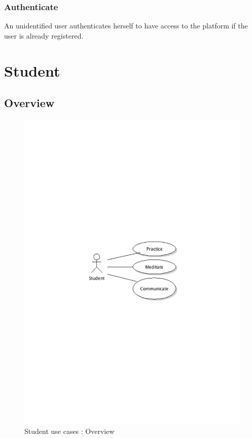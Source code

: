 		\subsubsection{Authenticate}An unidentified user authenticates herself to have access to the platform if the user is already registered.
\newpage
\section{Student}
	\subsection{Overview}
		\begin{figure}[ht]
			\begin{center}
				\includegraphics[width=\textwidth,  trim=2cm 12cm 2cm 12cm]{UML_figure/use_cases/student/UC_Student_General.pdf}
				\caption{Student use cases : Overview}
			\end{center}
		\end{figure}
